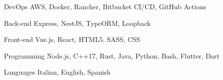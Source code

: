 

\begin{cvskills}

	\cvskill
	{DevOps} %
	{AWS, Docker, Rancher, Bitbucket CI/CD, GitHub Actions} %

	\cvskill
	{Back-end} %
	{Express, NestJS, TypeORM, Loopback} %

	\cvskill
	{Front-end} %
	{Vue.js, React, HTML5, SASS, CSS} %

	\cvskill
	{Programming} %
	{Node.js, C++17, Rust, Java, Python, Bash, Flutter, Dart} %

	\cvskill
	{Languages} %
	{Italian, English, Spanish} %

\end{cvskills}
